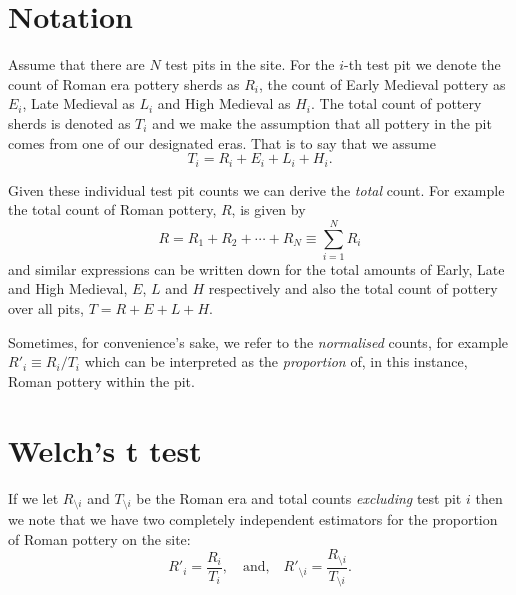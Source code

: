 \documentclass[conference]{IEEEtran}
\begin{document}
\section{Notation}

Assume that there are $N$ test pits in the site. For the $i$-th test pit we
denote the count of Roman era pottery sherds as $R_i$, the count of Early
Medieval pottery as $E_i$, Late Medieval as $L_i$ and High Medieval as $H_i$.
The total count of pottery sherds is denoted as $T_i$ and we make the assumption
that all pottery in the pit comes from one of our designated eras. That is to
say that we assume
\[
    T_i = R_i + E_i + L_i + H_i.
\]

Given these individual test pit counts we can derive the \emph{total} count.
For example the total count of Roman pottery, $R$, is given by
\[
    R = R_1 + R_2 + \cdots + R_N \equiv \sum_{i=1}^N R_i
\]
and similar expressions can be written down for the total amounts of Early, Late
and High Medieval, $E$, $L$ and $H$ respectively and also the total count of
pottery over all pits, $T = R + E + L + H$.

Sometimes, for convenience's sake, we refer to the \emph{normalised} counts,
for example $R'_i \equiv R_i / T_i$ which can be interpreted as the
\emph{proportion} of, in this instance, Roman pottery within the pit.

\section{Welch's t test}

If we let $R_{\setminus i}$ and $T_{\setminus i}$ be the Roman era and total
counts \emph{excluding} test pit $i$ then we note that we have two completely
independent estimators for the proportion of Roman pottery on the site:
\[
    R'_i = \frac{R_i}{T_i}, \quad \mbox{and,} \quad
    R'_{\setminus i} = \frac{R_{\setminus i}}{T_{\setminus i}}.
\]
\end{document}
